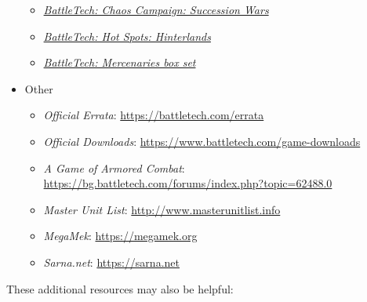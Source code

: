 \begin{itemize}
\begin{itemize}
    \item \emph{\href{https://store.catalystgamelabs.com/products/battletech-chaos-campaign-succession-wars}{BattleTech: Chaos Campaign: Succession Wars}}

    \item \emph{\href{https://store.catalystgamelabs.com/products/battletech-hot-spots-hinterlands}{BattleTech: Hot Spots: Hinterlands}}

    \item \emph{\href{https://store.catalystgamelabs.com/products/battletech-mercenaries-box-set}{BattleTech: Mercenaries box set}}

  \end{itemize}

  \item Other

  \begin{itemize}

    \item \emph{Official Errata}: \href{https://battletech.com/errata}{https://battletech.com/errata}

    \item \emph{Official Downloads}: \href{https://www.battletech.com/game-downloads}{https://www.battletech.com/game-downloads}

    \item \emph{A Game of Armored Combat}: \href{https://bg.battletech.com/forums/index.php?topic=62488.0}{https://bg.battletech.com/forums/index.php?topic=62488.0}

    \item \emph{Master Unit List}: \href{http://www.masterunitlist.info}{http://www.masterunitlist.info}

    \item \emph{MegaMek}: \href{https://megamek.org}{https://megamek.org}

    \item \emph{Sarna.net}: \href{https://sarna.net}{https://sarna.net}

  \end{itemize}

\end{itemize}

These additional resources may also be helpful:

